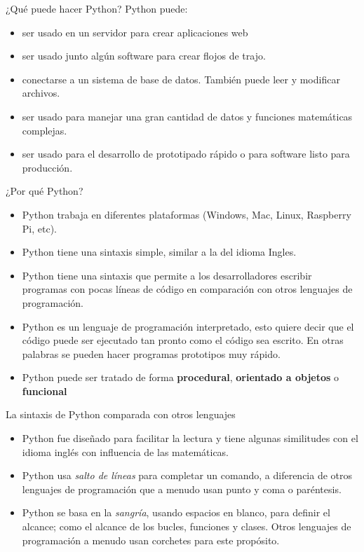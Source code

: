 \begin{frame}[c]{¿Qué puede hacer Python?}
  Python puede:
  \begin{itemize}
    \item ser usado en un servidor para crear aplicaciones web
    \pausa
    \item ser usado junto algún software para crear flojos de trajo.
    \pausa
    \item conectarse a un sistema de base de datos. También puede leer y
          modificar archivos.
    \pausa
    \item ser usado para manejar una gran cantidad de datos y funciones
          matemáticas complejas.
    \pausa
    \item ser usado para el desarrollo de prototipado rápido o para software
          listo para producción.
  \end{itemize}
\end{frame}

\begin{frame}[c]{¿Por qué Python?}
  \begin{itemize}
    \item Python trabaja en diferentes plataformas (Windows, Mac, Linux,
      Raspberry Pi, etc).
    \pausa
    \item Python tiene una sintaxis simple, similar a la del idioma Ingles.
    \pausa
    \item Python tiene una sintaxis que permite a los desarrolladores
      escribir programas con pocas líneas de código en comparación con otros
      lenguajes de programación.
    \pausa
    \item Python es un lenguaje de programación interpretado, esto quiere
      decir que el código puede ser ejecutado tan pronto como el código sea
      escrito. En otras palabras se pueden hacer programas prototipos muy
      rápido.
    \pausa
    \item Python puede ser tratado de forma \textbf{procedural},
      \textbf{orientado a objetos} o \textbf{funcional}
  \end{itemize}
\end{frame}

\begin{frame}[c]{La sintaxis de Python comparada con otros lenguajes}
  \begin{itemize}
    \item Python fue diseñado para facilitar la lectura y tiene algunas
      similitudes con el idioma inglés con influencia de las matemáticas.
    \pausa
    \item Python usa \emph{salto de líneas} para completar un comando, a
      diferencia de otros lenguajes de programación que a menudo usan punto
      y coma o paréntesis.
    \pausa
    \item Python se basa en la \emph{sangría}, usando espacios en blanco, para
      definir el alcance; como el alcance de los bucles, funciones y clases.
      Otros lenguajes de programación a menudo usan corchetes para este
      propósito.
  \end{itemize}
\end{frame}

